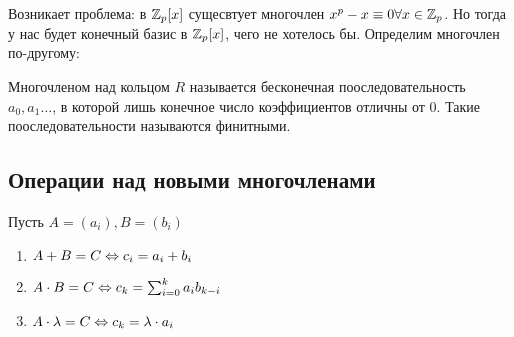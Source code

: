 \begin{note}
    Возникает проблема: в \(\mathbb{Z}_p[x]\) сущесвтует многочлен \(x^p - x \equiv 0 \forall x \in \mathbb{Z}_p\). Но тогда у нас будет конечный базис в \(\mathbb{Z}_p[x]\), чего не хотелось бы. Определим многочлен по-другому:
\end{note}

\begin{definition}
    Многочленом над кольцом \(R\) называется бесконечная пооследовательность \(a_0, a_1 \dots \), в которой лишь конечное число коэффициентов отличны от 0. Такие пооследовательности называются финитными.
\end{definition}

\subsection{Операции над новыми многочленами}
Пусть \(A = (a_i), B = (b_i)\)
\begin{enumerate}
    \item \(A + B = C \Leftrightarrow c_i = a_i + b_i\)
    \item \(A \cdot B = C \Leftrightarrow c_k = \sum_{i = 0}^ka_ib_{k-i}\)
    \item \(A \cdot \lambda = C \Leftrightarrow c_k = \lambda\cdot a_i\)
\end{enumerate}